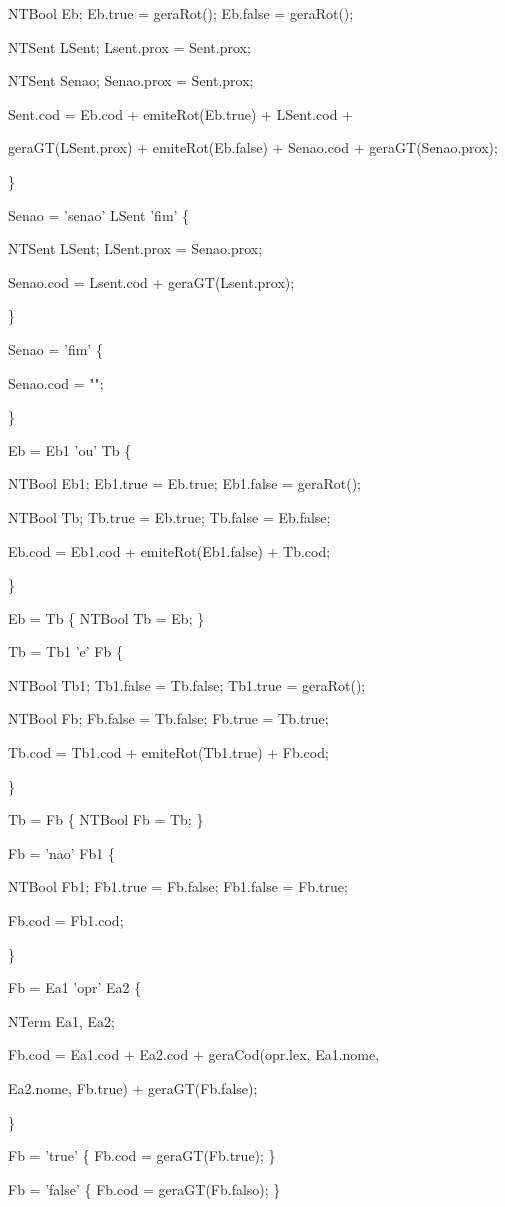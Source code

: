 \documentclass[11pt]{article}
\begin{document}
NTBool Eb; Eb.true = geraRot(); Eb.false = geraRot();

NTSent LSent; Lsent.prox = Sent.prox;

NTSent Senao; Senao.prox = Sent.prox;

Sent.cod = Eb.cod + emiteRot(Eb.true) + LSent.cod +

geraGT(LSent.prox) + emiteRot(Eb.false) + Senao.cod + geraGT(Senao.prox);

\}

Senao = 'senao' LSent 'fim' \{ 

NTSent LSent; LSent.prox = Senao.prox;

Senao.cod = Lsent.cod + geraGT(Lsent.prox);

\}

Senao = 'fim' \{

Senao.cod = "";

\}

Eb = Eb1 'ou' Tb \{

NTBool Eb1; Eb1.true = Eb.true; Eb1.false = geraRot();

NTBool Tb; Tb.true = Eb.true; Tb.false = Eb.false;

Eb.cod = Eb1.cod + emiteRot(Eb1.false) + Tb.cod;

\}

Eb = Tb \{ NTBool Tb = Eb; \}

Tb = Tb1 'e' Fb \{

NTBool Tb1; Tb1.false = Tb.false; Tb1.true = geraRot();

NTBool Fb; Fb.false = Tb.false; Fb.true = Tb.true;

Tb.cod = Tb1.cod + emiteRot(Tb1.true) + Fb.cod;

\}

Tb = Fb \{ NTBool Fb = Tb; \}


Fb = 'nao' Fb1 \{ 

NTBool Fb1; Fb1.true = Fb.false; Fb1.false = Fb.true; 

Fb.cod = Fb1.cod;

\}

Fb = Ea1 'opr' Ea2 \{

NTerm Ea1, Ea2;

Fb.cod = Ea1.cod + Ea2.cod + geraCod(opr.lex, Ea1.nome,

Ea2.nome, Fb.true) + geraGT(Fb.false);

\}

Fb = 'true' \{ Fb.cod = geraGT(Fb.true); \}

Fb = 'false' \{ Fb.cod = geraGT(Fb.falso); \}
\end{document}
